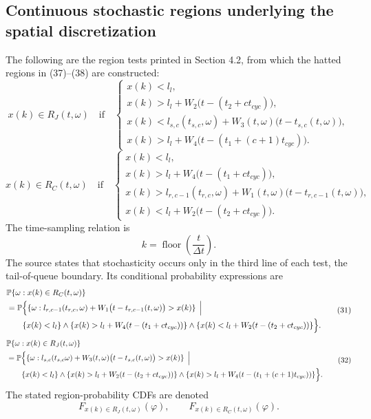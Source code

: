 \documentclass{article}
\begin{document}
\subsection*{Continuous stochastic regions underlying the spatial discretization}
The following are the region tests printed in Section 4.2, from which the hatted regions in (37)--(38) are constructed:
\begin{equation}
x(k)\in R_J(t,\omega)\quad\text{if}\quad
\begin{cases}
x(k)<l_l,\\
x(k)>l_l+W_2\bigl(t-(t_2+ct_{cyc})\bigr),\\
x(k)<l_{s,c}(t_{s,c},\omega)+W_3(t,\omega)\bigl(t-t_{s,c}(t,\omega)\bigr),\\
x(k)>l_l+W_4\bigl(t-(t_1+(c+1)t_{cyc})\bigr).
\end{cases}
\tag{29}
\end{equation}
\begin{equation}
x(k)\in R_C(t,\omega)\quad\text{if}\quad
\begin{cases}
x(k)<l_l,\\
x(k)>l_l+W_4\bigl(t-(t_1+ct_{cyc})\bigr),\\
x(k)>l_{r,c-1}(t_{r,c},\omega)+W_1(t,\omega)\bigl(t-t_{r,c-1}(t,\omega)\bigr),\\
x(k)<l_l+W_2\bigl(t-(t_2+ct_{cyc})\bigr).
\end{cases}
\tag{30}
\end{equation}
The time-sampling relation is
\[
k=\operatorname{floor}\left(\frac{t}{\Delta t}\right).
\]
The source states that stochasticity occurs only in the third line of each test, the tail-of-queue boundary. Its conditional probability expressions are
\begin{equation}
\begin{aligned}
&\mathbb P\{\omega:x(k)\in R_C(t,\omega)\}\\
&=\mathbb P\Bigl\{
\{\omega:l_{r,c-1}(t_{r,c},\omega)
+W_1\bigl(t-t_{r,c-1}(t,\omega)\bigr)>x(k)\}\,\Bigm|\\
&\hspace{2em}\{x(k)<l_l\}\wedge
\{x(k)>l_l+W_4(t-(t_1+ct_{cyc}))\}\wedge
\{x(k)<l_l+W_2(t-(t_2+ct_{cyc}))\}
\Bigr\}.
\end{aligned}
\tag{31}
\end{equation}
\begin{equation}
\begin{aligned}
&\mathbb P\{\omega:x(k)\in R_J(t,\omega)\}\\
&=\mathbb P\Bigl\{
\{\omega:l_{s,c}(t_{s,c}\omega)
+W_3(t,\omega)\bigl(t-t_{s,c}(t,\omega)\bigr)>x(k)\}\,\Bigm|\\
&\hspace{2em}\{x(k)<l_l\}\wedge
\{x(k)>l_l+W_2(t-(t_2+ct_{cyc}))\}\wedge
\{x(k)>l_l+W_4(t-(t_1+(c+1)t_{cyc}))\}
\Bigr\}.
\end{aligned}
\tag{32}
\end{equation}
The stated region-probability CDFs are denoted
\[
F_{x(k)\in R_J(t,\omega)}(\varphi),\qquad
F_{x(k)\in R_C(t,\omega)}(\varphi).
\]
\end{document}

